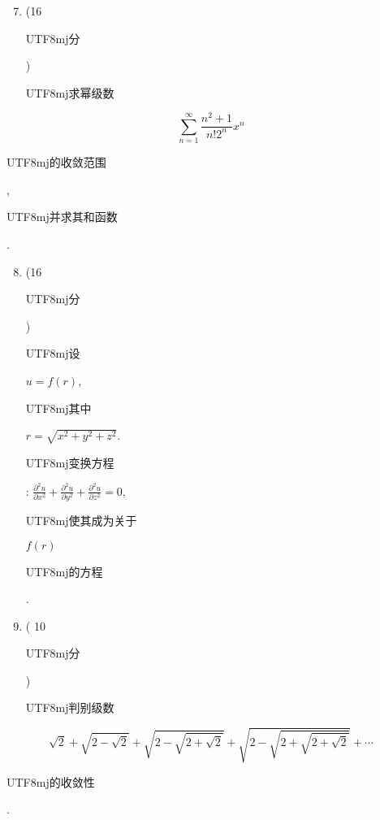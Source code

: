 \documentclass[10pt]{article}
\begin{document}
\begin{enumerate}
  \setcounter{enumi}{6}
  \item (16 \begin{CJK}{UTF8}{mj}分\end{CJK}) \begin{CJK}{UTF8}{mj}求幂级数\end{CJK}
\end{enumerate}
$$
\sum_{n=1}^{\infty} \frac{n^{2}+1}{n ! 2^{n}} x^{n}
$$
\begin{CJK}{UTF8}{mj}的收敛范围\end{CJK}, \begin{CJK}{UTF8}{mj}并求其和函数\end{CJK}.

\begin{enumerate}
  \setcounter{enumi}{7}
  \item (16 \begin{CJK}{UTF8}{mj}分\end{CJK}) \begin{CJK}{UTF8}{mj}设\end{CJK} $u=f(r)$, \begin{CJK}{UTF8}{mj}其中\end{CJK} $r=\sqrt{x^{2}+y^{2}+z^{2}}$. \begin{CJK}{UTF8}{mj}变换方程\end{CJK}: $\frac{\partial^{2} u}{\partial x^{2}}+\frac{\partial^{2} u}{\partial y^{2}}+\frac{\partial^{2} u}{\partial z^{2}}=0$, \begin{CJK}{UTF8}{mj}使其成为关于\end{CJK} $f(r)$ \begin{CJK}{UTF8}{mj}的方程\end{CJK}.

  \item ( 10 \begin{CJK}{UTF8}{mj}分\end{CJK}) \begin{CJK}{UTF8}{mj}判别级数\end{CJK}

\end{enumerate}
$$
\sqrt{2}+\sqrt{2-\sqrt{2}}+\sqrt{2-\sqrt{2+\sqrt{2}}}+\sqrt{2-\sqrt{2+\sqrt{2+\sqrt{2}}}}+\cdots
$$
\begin{CJK}{UTF8}{mj}的收敛性\end{CJK}.
\end{document}
